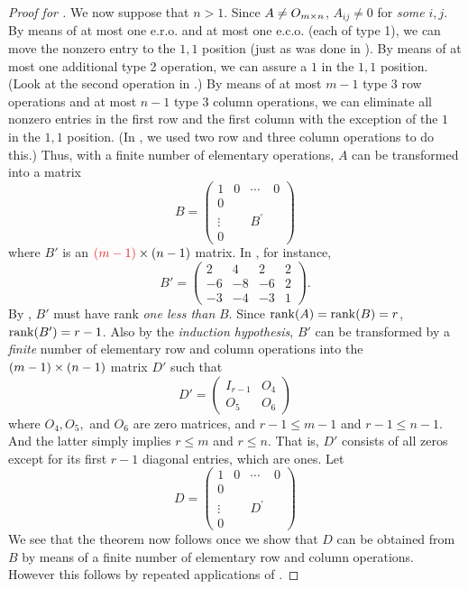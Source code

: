 \begin{proof}[Proof for ]
We now suppose that \(n > 1\).
Since \(A \ne O_{m \times n}\), \(A_{ij} \ne 0\) for \emph{some} \(i, j\).
By means of at most one e.r.o. and at most one e.c.o. (each of type 1), we can move the nonzero entry to the \(1,1\) position (just as was done in ).
By means of at most one additional type 2 operation, we can assure a \(1\) in the \(1,1\) position.
(Look at the second operation in .)
By means of at most \(m - 1\) type 3 row operations and at most \(n - 1\) type 3 column operations,
we can eliminate all nonzero entries in the first row and the first column with the exception of the \(1\) in the \(1,1\) position.
(In , we used two row and three column operations to do this.)
Thus, with a finite number of elementary operations, \(A\) can be transformed into a matrix
\[
    B= \left(\begin{array}{c|ccc}
        1 & 0 & \cdots & 0 \\
        \hline 0 & & & \\
        \vdots & & B^{\prime} & \\
        0 & & &
    \end{array}\right)
\]
where \(B'\) is an \(\RED{(m - 1)} \X (n - 1)\) matrix.
In , for instance,
\[
    B' = \begin{pmatrix}
        2 & 4 & 2 & 2 \\
        -6 & -8 & -6 & 2 \\
        -3 & -4 & -3 & 1
    \end{pmatrix}.
\]
By , \(B'\) must have rank \emph{one less than} \(B\).
Since \(\mathrm{rank}(A) = \mathrm{rank}(B) = r\), \(\mathrm{rank}(B') = r - 1\).
Also by the \emph{induction hypothesis}, \(B'\) can be transformed by a \emph{finite} number of elementary row and column operations into the \((m - 1) \times (n - 1)\) matrix \(D'\) such that
\[
    D' = \begin{pmatrix}
        I_{r - 1} & O_4 \\
        O_5 & O_6
    \end{pmatrix}
\]
where \(O_4, O_5,\) and \(O_6\) are zero matrices, and \(r - 1 \le m - 1\) and \(r - 1 \le n - 1\).
And the latter simply implies \(r \le m\) and \(r \le n\).
That is, \(D'\) consists of all zeros except for its first \(r - 1\) diagonal entries, which are ones.
Let
\[
    D = \left(\begin{array}{c|ccc}
        1 & 0 & \cdots & 0 \\
        \hline 0 & & & \\
        \vdots & & D^{\prime} & \\
        0 & & &
    \end{array}\right)
\]
We see that the theorem now follows once we show that \(D\) can be obtained from \(B\) by means of a finite number of elementary row and column operations.
However this follows by repeated applications of .


\end{proof}

